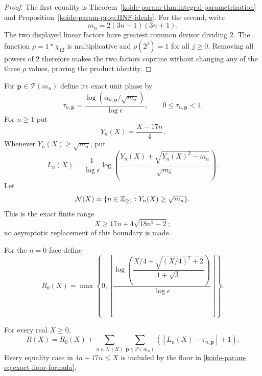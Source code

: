 \begin{proof}
The first equality is Theorem~\ref{koide-param-thm:integral-parametrization} and
Proposition~\ref{koide-param-prop:HNF-ideals}.  For the second, write
\[
 m_n=2(3n-1)(3n+1).
\]
The two displayed linear factors have greatest common divisor dividing
$2$.  The function $\rho=1*\chi_{12}$ is multiplicative and
$\rho(2^j)=1$ for all $j\geq0$.  Removing all powers of $2$ therefore
makes the two factors coprime without changing any of the three $\rho$
values, proving the product identity.
\end{proof}

For $\mathbf p\in\mathcal P(m_n)$ define its exact unit phase by
\begin{equation}
 \tau_{n,\mathbf p}
 =\frac{\log(\alpha_{n,\mathbf p}/\sqrt{m_n})}{\log\epsilon},
 \qquad0\leq\tau_{n,\mathbf p}<1.
 \label{koide-param-eq:unit-phase}
\end{equation}
For $n\geq1$ put
\begin{equation}
 Y_n(X)=\frac{X-17n}{4}.
 \label{koide-param-eq:Y-n}
\end{equation}
Whenever $Y_n(X)\geq\sqrt{m_n}$, put
\begin{equation}
 L_n(X)=
 \frac1{\log\epsilon}
 \log\!\left(
 \frac{Y_n(X)+\sqrt{Y_n(X)^2-m_n}}{\sqrt{m_n}}
 \right).
 \label{koide-param-eq:L-n}
\end{equation}
Let
\begin{equation}
 \mathcal N(X)=
 \{n\in\mathbb Z_{\geq1}:Y_n(X)\geq\sqrt{m_n}\}.
 \label{koide-param-eq:N-X}
\end{equation}
This is the exact finite range
\begin{equation}
 X\geq17n+4\sqrt{18n^2-2};
 \label{koide-param-eq:n-boundary}
\end{equation}
no asymptotic replacement of this boundary is made.

For the $n=0$ face define
\begin{equation}
 R_0(X)=
 \max\!\left\{0,
 \left\lfloor
 \frac{
 \log\!\left(
 \dfrac{X/4+\sqrt{(X/4)^2+2}}{1+\sqrt3}
 \right)}{\log\epsilon}
 \right\rfloor\right\}.
 \label{koide-param-eq:R0-exact}
\end{equation}

\begin{theorem}
\label{koide-param-thm:exact-floor}
For every real $X\geq0$,
\begin{equation}
 R(X)=R_0(X)+
 \sum_{n\in\mathcal N(X)}
 \sum_{\mathbf p\in\mathcal P(m_n)}
 \left(\left\lfloor L_n(X)-\tau_{n,\mathbf p}\right\rfloor+1\right).
 \label{koide-param-eq:exact-floor-formula}
\end{equation}
Every equality case in $4a+17n\leq X$ is included by the floor in
\eqref{koide-param-eq:exact-floor-formula}.
\end{theorem}

